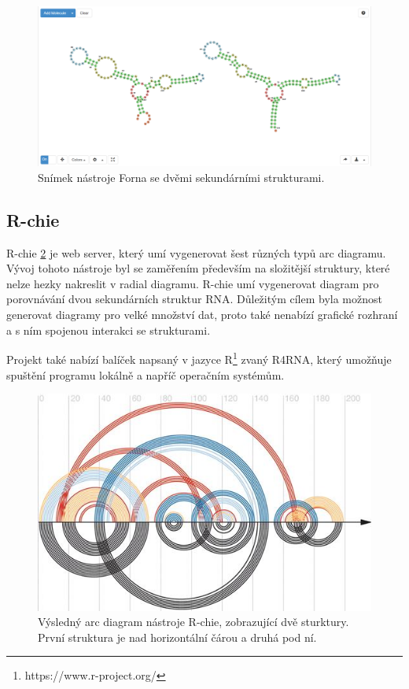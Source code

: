 \begin{figure}[H]
  \centering
  \includegraphics[width=140mm]{../img/kap01/tools/forna.png}
  \caption[Snímek nástroje Forna]{Snímek nástroje Forna se dvěmi sekundárními
  strukturami.}
  \label{fornascreen}
\end{figure}

\subsection{R-chie} 

R-chie \cite{Rchie}\ref{rchiescreen} je web server, který umí vygenerovat šest
různých typů arc diagramu. Vývoj tohoto nástroje byl se zaměřením především na
složitější struktury, které nelze hezky nakreslit v radial diagramu. R-chie umí
vygenerovat diagram pro porovnávání dvou sekundárních struktur RNA. Důležitým
cílem byla možnost generovat diagramy pro velké množství dat, proto také
nenabízí grafické rozhraní a s ním spojenou interakci se strukturami. 

Projekt také nabízí balíček napsaný v jazyce
R\footnote{https://www.r-project.org/} zvaný R4RNA, který umožňuje spuštění
programu lokálně a napříč operačním systémům.

\begin{figure}[H]
  \centering
  \includegraphics[width=140mm]{../img/kap01/tools/rchie.jpeg}
  \caption[Výsledný arc diagram nástroje R-chie]{Výsledný arc diagram nástroje
  R-chie, zobrazující dvě sturktury. První struktura je nad horizontální čárou
  a druhá pod ní.\protect\footnotemark}
  \label{rchiescreen}
\end{figure}

